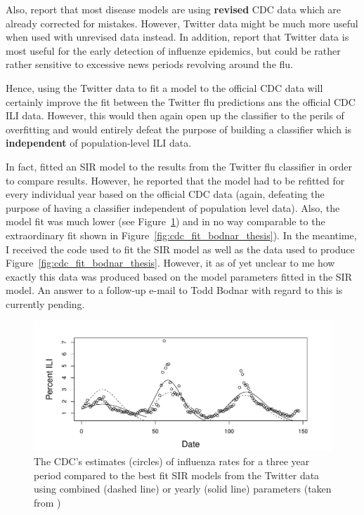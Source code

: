 \documentclass[11pt, a4paper]{article}\usepackage[]{graphicx}\usepackage[]{color}
\begin{document}
Also, \citep{paul_twitter_2014} report that most disease models are using \textbf{revised} CDC data which are already corrected for mistakes. However, Twitter data might be much more useful when used with unrevised data instead. In addition, \citep{aramaki_twitter_2011} report that Twitter data is most useful for the early detection of influenze epidemics, but could be rather rather sensitive to excessive news periods revolving around the flu.\newline

Hence, using the Twitter data to fit a model to the official CDC data will certainly improve the fit between the Twitter flu predictions ans the official CDC ILI data. However, this would then again open up the classifier to the perils of overfitting and would entirely defeat the purpose of building a classifier which is \textbf{independent} of population-level ILI data. \newline

In fact, \citep{bodnar_data_2015} fitted an SIR model to the results from the Twitter flu classifier in order to compare results. However, he reported that the model had to be refitted for every individual year based on the official CDC data (again, defeating the purpose of having a classifier independent of population level data). Also, the model fit was much lower (see Figure~\ref{fig:cdc_fit_bodnar_thesis_SIR}) and in no way comparable to the extraordinary fit shown in Figure~\ref{fig:cdc_fit_bodnar_thesis}). In the meantime, I received the code used to fit the SIR model as well as the data used to produce Figure~\ref{fig:cdc_fit_bodnar_thesis}. However, it as of yet unclear to me how exactly this data was produced based on the model parameters fitted in the SIR model. An answer to a follow-up e-mail to Todd Bodnar with regard to this is currently pending. 

\begin{figure}[h]
  \centering
    \includegraphics[width=.9\textwidth]{todd_bodnar_SIR.png}
  \caption{The CDC's estimates (circles) of influenza rates for a three year period compared to the best fit SIR models from the Twitter data using combined (dashed line) or yearly (solid line) parameters (taken from \citep{bodnar_data_2015})}
  \label{fig:cdc_fit_bodnar_thesis_SIR}
  \end{figure}
\end{document}
